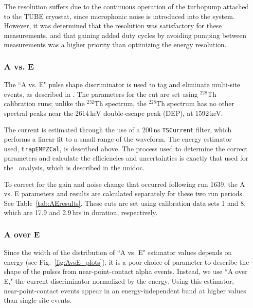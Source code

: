 \documentclass[groupedaddress,rmp,amsmath,amssymb,bibnotes,altaffilletter,twocolumn]{revtex4-1}
\begin{document}
The resolution suffers due to the continuous operation of the turbopump attached to the TUBE cryostat, since microphonic noise is introduced into the system. However, it was determined that the resolution was satisfactory for these measurements, and that gaining added duty cycles by avoiding pumping between measurements was a higher priority than optimizing the energy resolution. 

\subsubsection{A vs. E}
The ``A vs. E" pulse shape discriminator is used to tag and eliminate multi-site events, as described in \cite{AvsE_unidoc}. The parameters for the cut are set using $^{228}$Th calibration runs; unlike the $^{232}$Th spectrum, the $^{228}$Th spectrum has no other spectral peaks near the 2614\,keV double-escape peak (DEP), at 1592\,keV.

The current is estimated through the use of a 200\,ns {\tt TSCurrent} filter, which performs a linear fit to a small range of the waveform. The energy estimator used, {\tt trapEMPZCal}, is described above. The process used to determine the correct parameters and calculate the efficiencies and uncertainties is exactly that used for the \MJ\ analysis, which is described in the unidoc. 

To correct for the gain and noise change that occurred following run 1639, the A vs. E parameters and results are calculated separately for these two run periods. See Table~\ref{tab:AEresults}. These cuts are set using calibration data sets 1 and 8, which are 17.9 and 2.9\,hrs in duration, respectively. 

\subsubsection{A over E}
Since the width of the distribution of ``A vs. E" estimator values depends on energy (see Fig.~\ref{fig:AvsE_plots}), it is a poor choice of parameter to describe the shape of the pulses from near-point-contact alpha events. Instead, we use ``A over E," the current discriminator normalized by the energy. Using this estimator, near-point-contact events appear in an energy-independent band at higher values than single-site events. 
\end{document}

